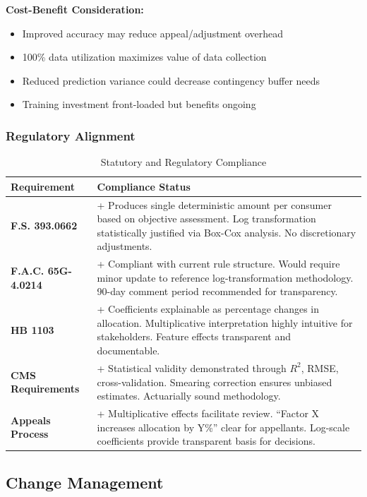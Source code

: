 \textbf{Cost-Benefit Consideration:}
\begin{itemize}
    \item Improved accuracy may reduce appeal/adjustment overhead
    \item 100\% data utilization maximizes value of data collection
    \item Reduced prediction variance could decrease contingency buffer needs
    \item Training investment front-loaded but benefits ongoing
\end{itemize}

\subsubsection{Regulatory Alignment}

\begin{table}[h]
\centering
\caption{Statutory and Regulatory Compliance}
\begin{tabular}{lp{10cm}}
\toprule
\textbf{Requirement} & \textbf{Compliance Status} \\
\midrule
\textbf{F.S. 393.0662} & + Produces single deterministic amount per consumer based on objective assessment. Log transformation statistically justified via Box-Cox analysis. No discretionary adjustments. \\
\midrule
\textbf{F.A.C. 65G-4.0214} & + Compliant with current rule structure. Would require minor update to reference log-transformation methodology. 90-day comment period recommended for transparency. \\
\midrule
\textbf{HB 1103} & + Coefficients explainable as percentage changes in allocation. Multiplicative interpretation highly intuitive for stakeholders. Feature effects transparent and documentable. \\
\midrule
\textbf{CMS Requirements} & + Statistical validity demonstrated through $R^2$, RMSE, cross-validation. Smearing correction ensures unbiased estimates. Actuarially sound methodology. \\
\midrule
\textbf{Appeals Process} & + Multiplicative effects facilitate review. ``Factor X increases allocation by Y\%'' clear for appellants. Log-scale coefficients provide transparent basis for decisions. \\
\bottomrule
\end{tabular}
\end{table}

\subsection{Change Management}

